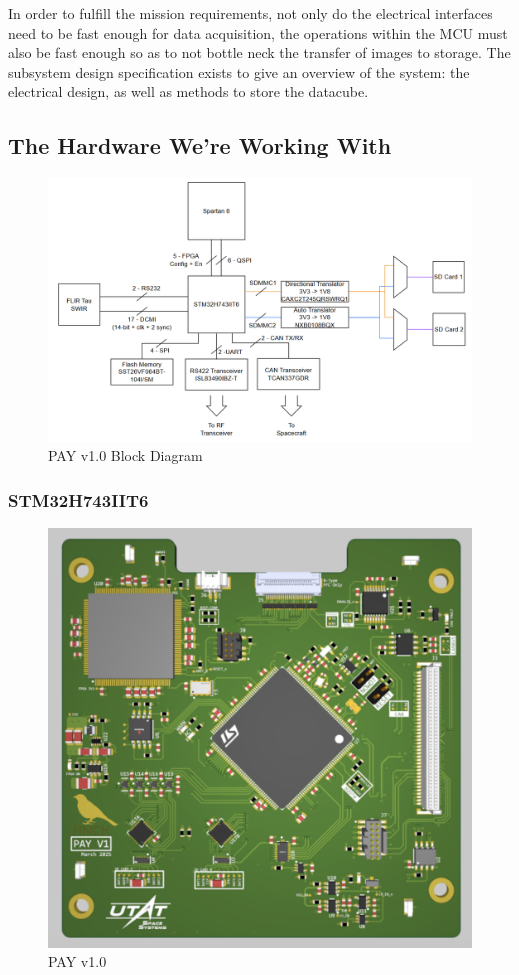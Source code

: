 \documentclass[12pt,a4paper]{article}
\begin{document}
    In order to fulfill the mission requirements, not only do the electrical 
    interfaces need to be fast enough for data acquisition, the operations within
    the MCU must also be fast enough so as to not bottle neck the transfer of images
    to storage. The subsystem design specification exists to give an overview of the system:
    the electrical design, as well as methods to store the datacube. 
    
    \subsection{The Hardware We're Working With}
    \begin{figure}[H]
        \centering
        \includegraphics[width=0.98\linewidth]{../figures/PAY_v1_0_blockdiagram.png}
        \caption{PAY v1.0 Block Diagram}
    \end{figure}


    \subsubsection{STM32H743IIT6}
    \begin{figure}[H]
        \centering
        \includegraphics[width=0.5\linewidth]{../figures/PAY_SS.png}
        \caption{PAY v1.0}
    \end{figure}
\end{document}
